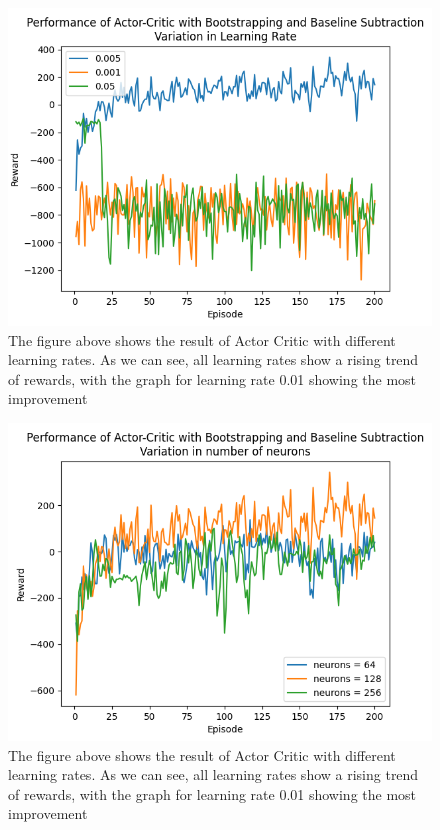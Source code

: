 \documentclass{article}
\begin{document}
\begin{figure}[htbp]
\centering
\includegraphics[width=0.9\linewidth]{Report/images/Performance_of_Actor_Critic_BSandBS_LR.png}
\caption{\label{fig:ActorCriticBS2-different learning rates}The figure above shows the result of Actor Critic with different learning rates. As we can see, all learning rates show a rising trend of rewards, with the graph for learning rate 0.01 showing the most improvement}
\end{figure}

\begin{figure}[htbp]
\centering
\includegraphics[width=0.9\linewidth]{Report/images/Performance_of_Actor_Critic_BSandBS_Neurons.png}
\caption{\label{fig:ActorCriticBS2-different neurons}The figure above shows the result of Actor Critic with different learning rates. As we can see, all learning rates show a rising trend of rewards, with the graph for learning rate 0.01 showing the most improvement}
\end{figure}
\end{document}
